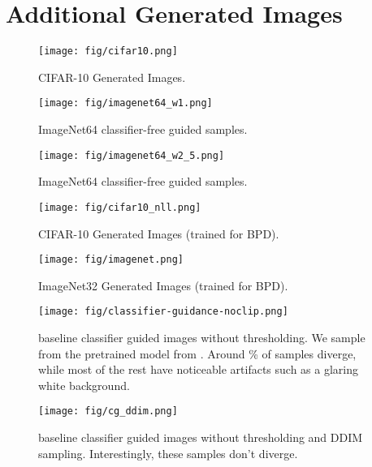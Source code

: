 \documentclass{article}
\theoremstyle{plain}
\theoremstyle{definition}
\theoremstyle{remark}
\begin{document}
 \newpage

\section{Additional Generated Images}\label{sec:app:fig}

\begin{figure}[H]
    \centering
    \texttt{[image: fig/cifar10.png]}
    \caption{CIFAR-10 Generated Images.}
\end{figure}

\begin{figure}[H]
    \centering
    \texttt{[image: fig/imagenet64\_w1.png]}
    \caption{ImageNet64  classifier-free guided samples.}
\end{figure}

\begin{figure}[H]
    \centering
    \texttt{[image: fig/imagenet64\_w2\_5.png]}
    \caption{ImageNet64  classifier-free guided samples.}
\end{figure}

\begin{figure}[H]
    \centering
    \texttt{[image: fig/cifar10\_nll.png]}
    \caption{CIFAR-10 Generated Images (trained for BPD).}
\end{figure}

\begin{figure}[H]
    \centering
    \texttt{[image: fig/imagenet.png]}
    \caption{ImageNet32 Generated Images (trained for BPD).}
\end{figure}

\begin{figure}[H]
    \centering
    \texttt{[image: fig/classifier-guidance-noclip.png]}
    \caption{ baseline classifier guided images without thresholding. We sample from the pretrained model from \citet{Dhariwal2021DiffusionMB}. Around \% of samples diverge, while most of the rest have noticeable artifacts such as a glaring white background.}\label{fig:cl_guidance_noclip}
\end{figure}

\begin{figure}[H]
    \centering
    \texttt{[image: fig/cg\_ddim.png]}
    \caption{ baseline classifier guided images without thresholding and DDIM sampling. Interestingly, these samples don't diverge.}\label{fig:cg_ddim}
\end{figure}
\end{document}
